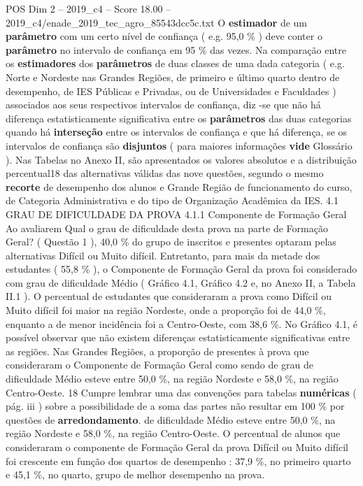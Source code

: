 \begin{textsample}{POS Dim 2 – 2019\_c4 – Score 18.00 – 2019\_c4/enade\_2019\_tec\_agro\_85543dcc5c.txt}
O \textbf{estimador} de um \textbf{parâmetro} com um certo nível de confiança ( e.g. 95,0 \% ) deve conter o \textbf{parâmetro} no intervalo de confiança em 95 \% das vezes.
Na comparação entre os \textbf{estimadores} dos \textbf{parâmetros} de duas classes de uma dada categoria ( e.g.
Norte e Nordeste nas Grandes Regiões, de primeiro e último quarto dentro de desempenho, de IES Públicas e Privadas, ou de Universidades e Faculdades ) associados aos seus respectivos intervalos de confiança, diz -se que não há diferença estatisticamente significativa entre os \textbf{parâmetros} das duas categorias quando há \textbf{interseção} entre os intervalos de confiança e que há diferença, se os intervalos de confiança são \textbf{disjuntos} ( para maiores informações \textbf{vide} Glossário ).
Nas Tabelas no Anexo II, são apresentados os valores absolutos e a distribuição percentual18 das alternativas válidas das nove questões, segundo o mesmo \textbf{recorte} de desempenho dos alunos e Grande Região de funcionamento do curso, de Categoria Administrativa e do tipo de Organização Acadêmica da IES. 4.1 GRAU DE DIFICULDADE DA PROVA 4.1.1 Componente de Formação Geral Ao avaliarem Qual o grau de dificuldade desta prova na parte de Formação Geral? ( Questão 1 ), 40,0 \% do grupo de inscritos e presentes optaram pelas alternativas Difícil ou Muito difícil.
Entretanto, para mais da metade dos estudantes ( 55,8 \% ), o Componente de Formação Geral da prova foi considerado com grau de dificuldade Médio ( Gráfico 4.1, Gráfico 4.2 e, no Anexo II, a Tabela II.1 ).
O percentual de estudantes que consideraram a prova como Difícil ou Muito difícil foi maior na região Nordeste, onde a proporção foi de 44,0 \%, enquanto a de menor incidência foi a Centro-Oeste, com 38,6 \%.
No Gráfico 4.1, é possível observar que não existem diferenças estatisticamente significativas entre as regiões.
Nas Grandes Regiões, a proporção de presentes à prova que consideraram o Componente de Formação Geral como sendo de grau de dificuldade Médio esteve entre 50,0 \%, na região Nordeste e 58,0 \%, na região Centro-Oeste. 18 Cumpre lembrar uma das convenções para tabelas \textbf{numéricas} ( pág. iii ) sobre a possibilidade de a soma das partes não resultar em 100 \% por questões de \textbf{arredondamento}. de dificuldade Médio esteve entre 50,0 \%, na região Nordeste e 58,0 \%, na região Centro-Oeste.
O percentual de alunos que consideraram o componente de Formação Geral da prova Difícil ou Muito difícil foi crescente em função dos quartos de desempenho : 37,9 \%, no primeiro quarto e 45,1 \%, no quarto, grupo de melhor desempenho na prova.

\end{textsample}
